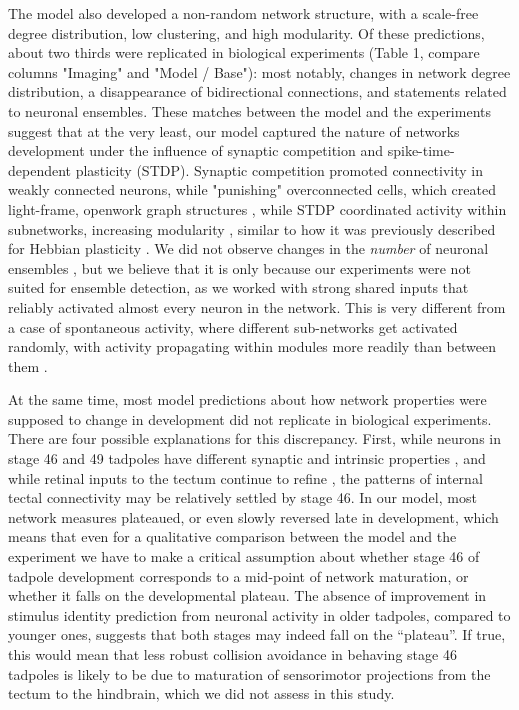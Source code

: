 \documentclass{article}
\begin{document}
The model also developed a non-random network structure, with a scale-free degree distribution, low clustering, and high modularity. Of these predictions, about two thirds were replicated in biological experiments (Table 1, compare columns "Imaging" and "Model / Base"): most notably, changes in network degree distribution, a disappearance of bidirectional connections, and statements related to neuronal ensembles. These matches between the model and the experiments suggest that at the very least, our model captured the nature of networks development under the influence of synaptic competition and spike-time-dependent plasticity (STDP). Synaptic competition promoted connectivity in weakly connected neurons, while "punishing" overconnected cells, which created light-frame, openwork graph structures \citep{fiete2010chains}, while STDP coordinated activity within subnetworks, increasing modularity \citep{stam2010modular,litwin2014assemblies}, similar to how it was previously described for Hebbian plasticity \citep{triplett2018emergence,damicelli2018topomod}. We did not observe changes in the \textit{number} of neuronal ensembles \citep{avitan2017spontaneous,pietri2017emergence}, but we believe that it is only because our experiments were not suited for ensemble detection, as we worked with strong shared inputs that reliably activated almost every neuron in the network. This is very different from a case of spontaneous activity, where different sub-networks get activated randomly, with activity propagating within modules more readily than between them \citep{avitan2017spontaneous}.

At the same time, most model predictions about how network properties were supposed to change in development did not replicate in biological experiments. There are four possible explanations for this discrepancy. First, while neurons in stage 46 and 49 tadpoles have different synaptic and intrinsic properties \citep{ciarleglio2015}, and while retinal inputs to the tectum continue to refine \citep{tao2005refinement, munz2014hebbian}, the patterns of internal tectal connectivity may be relatively settled by stage 46. In our model, most network measures plateaued, or even slowly reversed late in development, which means that even for a qualitative comparison between the model and the experiment we have to make a critical assumption about whether stage 46 of tadpole development corresponds to a mid-point of network maturation, or whether it falls on the developmental plateau. The absence of improvement in stimulus identity prediction from neuronal activity in older tadpoles, compared to younger ones, suggests that both stages may indeed fall on the “plateau”. If true, this would mean that less robust collision avoidance in behaving stage 46 tadpoles \citep{dong2009} is likely to be due to maturation of sensorimotor projections from the tectum to the hindbrain, which we did not assess in this study.
\end{document}
